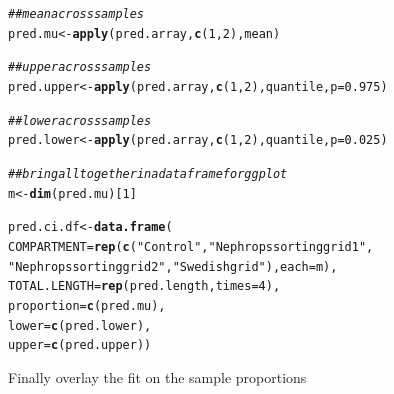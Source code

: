 \documentclass[12pt]{article}\usepackage[]{graphicx}\usepackage[]{color}
\makeatletter
\newcommand{\hlnum}[1]{\textcolor[rgb]{0.686,0.059,0.569}{#1}}%
\newcommand{\hlstr}[1]{\textcolor[rgb]{0.192,0.494,0.8}{#1}}%
\newcommand{\hlcom}[1]{\textcolor[rgb]{0.678,0.584,0.686}{\textit{#1}}}%
\newcommand{\hlstd}[1]{\textcolor[rgb]{0.345,0.345,0.345}{#1}}%
\newcommand{\hlkwb}[1]{\textcolor[rgb]{0.69,0.353,0.396}{#1}}%
\newcommand{\hlkwc}[1]{\textcolor[rgb]{0.333,0.667,0.333}{#1}}%
\newcommand{\hlkwd}[1]{\textcolor[rgb]{0.737,0.353,0.396}{\textbf{#1}}}%
\newenvironment{kframe}{%
 \def\at@end@of@kframe{}%
 \ifinner\ifhmode%
  \def\at@end@of@kframe{\end{minipage}}%
  \begin{minipage}{\columnwidth}%
 \fi\fi%
 \def\FrameCommand##1{\hskip\@totalleftmargin \hskip-\fboxsep
 \colorbox{shadecolor}{##1}\hskip-\fboxsep
     \hskip-\linewidth \hskip-\@totalleftmargin \hskip\columnwidth}%
 \MakeFramed {\advance\hsize-\width
   \@totalleftmargin\z@ \linewidth\hsize
   \@setminipage}}%
 {\par\unskip\endMakeFramed%
 \at@end@of@kframe}
\newenvironment{knitrout}{}{} %
\makeatother
\begin{document}
\begin{knitrout}
\begin{kframe}
\begin{alltt}
\hlcom{## mean across samples}
\hlstd{pred.mu} \hlkwb{<-} \hlkwd{apply}\hlstd{(pred.array,} \hlkwd{c}\hlstd{(}\hlnum{1}\hlstd{,} \hlnum{2}\hlstd{), mean)}

\hlcom{## upper across samples}
\hlstd{pred.upper} \hlkwb{<-} \hlkwd{apply}\hlstd{(pred.array,} \hlkwd{c}\hlstd{(}\hlnum{1}\hlstd{,} \hlnum{2}\hlstd{), quantile,} \hlkwc{p} \hlstd{=} \hlnum{0.975}\hlstd{)}

\hlcom{## lower across samples}
\hlstd{pred.lower} \hlkwb{<-} \hlkwd{apply}\hlstd{(pred.array,} \hlkwd{c}\hlstd{(}\hlnum{1}\hlstd{,} \hlnum{2}\hlstd{), quantile,} \hlkwc{p} \hlstd{=} \hlnum{0.025}\hlstd{)}

\hlcom{## bring all together in a data frame for ggplot}
\hlstd{m} \hlkwb{<-} \hlkwd{dim}\hlstd{(pred.mu)[}\hlnum{1}\hlstd{]}

\hlstd{pred.ci.df} \hlkwb{<-} \hlkwd{data.frame}\hlstd{(}
                \hlkwc{COMPARTMENT} \hlstd{=} \hlkwd{rep}\hlstd{(}\hlkwd{c}\hlstd{(}\hlstr{"Control"}\hlstd{,} \hlstr{"Nephrops sorting grid 1"}\hlstd{,}
                  \hlstr{"Nephrops sorting grid 2"}\hlstd{,} \hlstr{"Swedish grid"}\hlstd{),} \hlkwc{each} \hlstd{= m),}
                \hlkwc{TOTAL.LENGTH} \hlstd{=} \hlkwd{rep}\hlstd{(pred.length,} \hlkwc{times} \hlstd{=} \hlnum{4}\hlstd{),}
                \hlkwc{proportion} \hlstd{=} \hlkwd{c}\hlstd{(pred.mu),}
                \hlkwc{lower} \hlstd{=} \hlkwd{c}\hlstd{(pred.lower),}
                \hlkwc{upper} \hlstd{=} \hlkwd{c}\hlstd{(pred.upper))}
\end{alltt}
\end{kframe}
\end{knitrout}

Finally overlay the fit on the sample proportions
\end{document}
